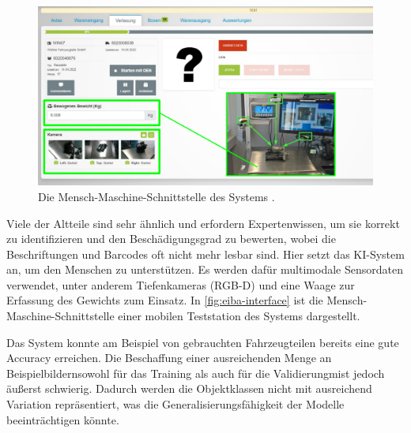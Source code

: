 \begin{figure}[b!]
	\centering
	\includegraphics[width=\textwidth]{figure_eiba_interface.png}
	\caption[Die Mensch-Maschine-Schnittstelle des Systems.]{Die Mensch-Maschine-Schnittstelle des Systems \parencite{Wagner2022reziprok}.}
	\label{fig:eiba-interface}
\end{figure}

Viele der Altteile sind sehr ähnlich und erfordern Expertenwissen, um sie korrekt zu identifizieren und den Beschädigungsgrad zu bewerten, wobei die Beschriftungen und Barcodes oft nicht mehr lesbar sind. Hier setzt das KI-System an, um den Menschen zu unterstützen. Es werden dafür multimodale Sensordaten verwendet, unter anderem Tiefenkameras (RGB-D) und eine Waage zur Erfassung des Gewichts zum Einsatz. In \autoref{fig:eiba-interface} ist die Mensch-Maschine-Schnittstelle einer mobilen Teststation des Systems dargestellt.

Das System konnte am Beispiel von gebrauchten Fahrzeugteilen bereits eine gute Accuracy erreichen. Die Beschaffung einer ausreichenden Menge an Beispielbildern\textemdash sowohl für das Training als auch für die Validierung\textemdash mist jedoch äußerst schwierig. Dadurch werden die Objektklassen nicht mit ausreichend Variation repräsentiert, was die Generalisierungsfähigkeit der Modelle beeinträchtigen könnte.


